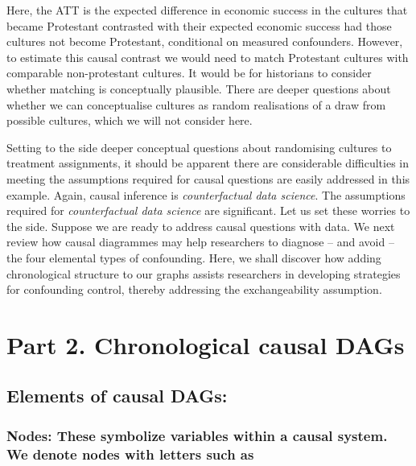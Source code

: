 \documentclass[
  singlecolumn]{report}
\begin{document}
Here, the ATT is the expected difference in economic success in the
cultures that became Protestant contrasted with their expected economic
success had those cultures not become Protestant, conditional on
measured confounders. However, to estimate this causal contrast we would
need to match Protestant cultures with comparable non-protestant
cultures. It would be for historians to consider whether matching is
conceptually plausible. There are deeper questions about whether we can
conceptualise cultures as random realisations of a draw from possible
cultures, which we will not consider here.

Setting to the side deeper conceptual questions about randomising
cultures to treatment assignments, it should be apparent there are
considerable difficulties in meeting the assumptions required for causal
questions are easily addressed in this example. Again, causal inference
is \emph{counterfactual data science}. The assumptions required for
\emph{counterfactual data science} are significant. Let us set these
worries to the side. Suppose we are ready to address causal questions
with data. We next review how causal diagrammes may help researchers to
diagnose -- and avoid -- the four elemental types of confounding. Here,
we shall discover how adding chronological structure to our graphs
assists researchers in developing strategies for confounding control,
thereby addressing the exchangeability assumption.

\hypertarget{part-2.-chronological-causal-dags}{%
\section{Part 2. Chronological causal
DAGs}\label{part-2.-chronological-causal-dags}}

\hypertarget{elements-of-causal-dags}{%
\subsection{Elements of causal DAGs:}\label{elements-of-causal-dags}}

\hypertarget{nodes-these-symbolize-variables-within-a-causal-system.-we-denote-nodes-with-letters-such-as}{%
\subsubsection{\texorpdfstring{\textbf{Nodes:} These symbolize variables
within a causal system. We denote nodes with letters such
as}{Nodes: These symbolize variables within a causal system. We denote nodes with letters such as}}\label{nodes-these-symbolize-variables-within-a-causal-system.-we-denote-nodes-with-letters-such-as}}
\end{document}
